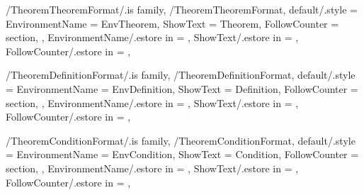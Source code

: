 
\pgfkeys
{
  /TheoremTheoremFormat/.is family, /TheoremTheoremFormat,
  default/.style =
  {
    EnvironmentName = {EnvTheorem},
    ShowText = {Theorem},
    FollowCounter = section,
  },
  EnvironmentName/.estore in = \GetTheoremTheoremFormatEnvironmentName,
  ShowText/.estore in = \GetTheoremTheoremFormatShowText,
  FollowCounter/.estore in = \GetTheoremTheoremFormatFollowCounter,
} %

\newcommand{\InsertTheorem}[2][\empty]
{%
  \InsertTheoremContent[#1]{\GetTheoremTheoremFormatEnvironmentName}{#2}%
} %

\newcommand{\InitTheoremTheoremFormat}
{%
  \theoremstyle{plain}%
  \ifthenelse{\equal{\GetTheoremTheoremFormatFollowCounter}{\empty}}%
  {%
    \newtheorem{%
      \GetTheoremTheoremFormatEnvironmentName}{%
      \GetTheoremTheoremFormatShowText}%
  }%
  {%
    \newtheorem{%
      \GetTheoremTheoremFormatEnvironmentName}{%
      \GetTheoremTheoremFormatShowText}[%
      \GetTheoremTheoremFormatFollowCounter]%
  }%
} %


\pgfkeys
{
  /TheoremDefinitionFormat/.is family, /TheoremDefinitionFormat,
  default/.style =
  {
    EnvironmentName = {EnvDefinition},
    ShowText = {Definition},
    FollowCounter = section,
  },
  EnvironmentName/.estore in = \GetTheoremDefinitionFormatEnvironmentName,
  ShowText/.estore in = \GetTheoremDefinitionFormatShowText,
  FollowCounter/.estore in = \GetTheoremDefinitionFormatFollowCounter,
} %

\newcommand{\InsertDefinition}[2][\empty]
{%
  \InsertTheoremContent[#1]{\GetTheoremDefinitionFormatEnvironmentName}{#2}%
} %

\newcommand{\InitTheoremDefinitionFormat}
{%
  \theoremstyle{definition}%
  \ifthenelse{\equal{\GetTheoremDefinitionFormatFollowCounter}{\empty}}%
  {%
    \newtheorem{%
      \GetTheoremDefinitionFormatEnvironmentName}{%
      \GetTheoremDefinitionFormatShowText}%
  }%
  {%
    \newtheorem{%
      \GetTheoremDefinitionFormatEnvironmentName}{%
      \GetTheoremDefinitionFormatShowText}[%
      \GetTheoremDefinitionFormatFollowCounter]%
  }%
} %


\pgfkeys
{
  /TheoremConditionFormat/.is family, /TheoremConditionFormat,
  default/.style =
  {
    EnvironmentName = {EnvCondition},
    ShowText = {Condition},
    FollowCounter = section,
  },
  EnvironmentName/.estore in = \GetTheoremConditionFormatEnvironmentName,
  ShowText/.estore in = \GetTheoremConditionFormatShowText,
  FollowCounter/.estore in = \GetTheoremConditionFormatFollowCounter,
} %

